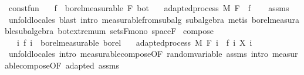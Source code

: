 \begin{isabellebody}
\isanewline
\isanewline
{}\isamarkupfalse%
\ const{\isacharunderscore}{\kern0pt}fun{\isacharcolon}{\kern0pt}\isanewline
\ \ \ {\isachardoublequoteopen}f\ {\isasymin}\ borel{\isacharunderscore}{\kern0pt}measurable\ {\isacharparenleft}{\kern0pt}F\ bot{\isacharparenright}{\kern0pt}{\isachardoublequoteclose}\isanewline
\ \ \ {\isachardoublequoteopen}adapted{\isacharunderscore}{\kern0pt}process\ M\ F\ {\isacharparenleft}{\kern0pt}{\isasymlambda}{\isacharunderscore}{\kern0pt}{\isachardot}{\kern0pt}\ f{\isacharparenright}{\kern0pt}{\isachardoublequoteclose}\isanewline
%
\isadelimproof
\ \ %
\endisadelimproof
%
\isatagproof
{}\isamarkupfalse%
\ assms\ \isamarkupfalse%
\ {\isacharparenleft}{\kern0pt}unfold{\isacharunderscore}{\kern0pt}locales{\isacharparenright}{\kern0pt}\ {\isacharparenleft}{\kern0pt}blast\ intro{\isacharcolon}{\kern0pt}\ measurable{\isacharunderscore}{\kern0pt}from{\isacharunderscore}{\kern0pt}subalg\ subalgebra{\isacharcomma}{\kern0pt}\ metis\ borel{\isacharunderscore}{\kern0pt}measurable{\isacharunderscore}{\kern0pt}subalgebra\ bot{\isachardot}{\kern0pt}extremum\ sets{\isacharunderscore}{\kern0pt}F{\isacharunderscore}{\kern0pt}mono\ space{\isacharunderscore}{\kern0pt}F{\isacharparenright}{\kern0pt}%
\endisatagproof
{\isafoldproof}%
%
\isadelimproof
\isanewline
%
\endisadelimproof
\isanewline
{}\isamarkupfalse%
\ compose{\isacharcolon}{\kern0pt}\isanewline
\ \ \ {\isachardoublequoteopen}{\isasymAnd}i{\isachardot}{\kern0pt}\ f\ i\ {\isasymin}\ borel{\isacharunderscore}{\kern0pt}measurable\ borel{\isachardoublequoteclose}\isanewline
\ \ \ {\isachardoublequoteopen}adapted{\isacharunderscore}{\kern0pt}process\ M\ F\ {\isacharparenleft}{\kern0pt}{\isasymlambda}i\ {\isasymxi}{\isachardot}{\kern0pt}\ {\isacharparenleft}{\kern0pt}f\ i{\isacharparenright}{\kern0pt}\ {\isacharparenleft}{\kern0pt}X\ i\ {\isasymxi}{\isacharparenright}{\kern0pt}{\isacharparenright}{\kern0pt}{\isachardoublequoteclose}\isanewline
%
\isadelimproof
\ \ %
\endisadelimproof
%
\isatagproof
{}\isamarkupfalse%
\ {\isacharparenleft}{\kern0pt}unfold{\isacharunderscore}{\kern0pt}locales{\isacharcomma}{\kern0pt}\ intro\ measurable{\isacharunderscore}{\kern0pt}compose{\isacharbrackleft}{\kern0pt}OF\ random{\isacharunderscore}{\kern0pt}variable\ assms{\isacharbrackright}{\kern0pt}{\isacharcomma}{\kern0pt}\ intro\ measurable{\isacharunderscore}{\kern0pt}compose{\isacharbrackleft}{\kern0pt}OF\ adapted\ assms{\isacharbrackright}{\kern0pt}{\isacharparenright}{\kern0pt}%

\end{isabellebody}
